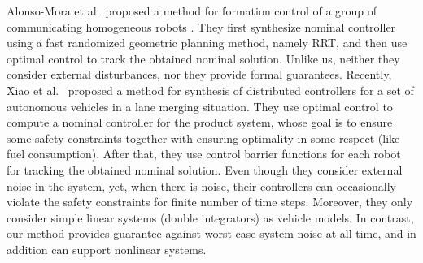\begin{enumerate}[(1)]
	Alonso-Mora et al.\ proposed a method for formation control of a group of communicating homogeneous robots \cite{alonso2019distributed}.
	They first synthesize nominal controller using a fast randomized geometric planning method, namely RRT, and then use optimal control to track the obtained nominal solution.
	Unlike us, neither they consider external disturbances, nor they provide formal guarantees.
	Recently, Xiao et al.\ \cite{xiao2019merging} proposed a method for synthesis of distributed controllers for a set of autonomous vehicles in a lane merging situation.
	They use optimal control to compute a nominal controller for the product system, whose goal is to ensure some safety constraints together with ensuring optimality in some respect (like fuel consumption).
	After that, they use control barrier functions for each robot for tracking the obtained nominal solution.
	Even though they consider external noise in the system, yet, when there is noise, their controllers can occasionally violate the safety constraints for finite number of time steps.
	Moreover, they only consider simple linear systems (double integrators) as vehicle models.
	In contrast, our method provides guarantee against worst-case system noise at all time, and in addition can support nonlinear systems. 
\end{enumerate}
 

